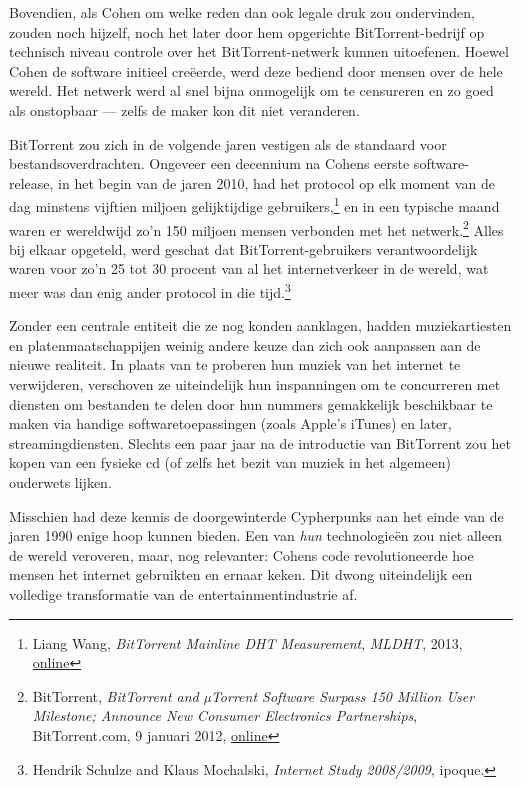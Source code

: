 \documentclass[
  a5paper,
  smalldemyvopaper,11pt,twoside,onecolumn,openright,extrafontsizes,
hidelinks]{memoir}
\begin{document}
Bovendien, als Cohen om welke reden dan ook legale druk zou ondervinden,
zouden noch hijzelf, noch het later door hem opgerichte
BitTorrent-bedrijf op technisch niveau controle over het
BitTorrent-netwerk kunnen uitoefenen. Hoewel Cohen de software initieel
creëerde, werd deze bediend door mensen over de hele wereld. Het netwerk
werd al snel bijna onmogelijk om te censureren en zo goed als onstopbaar
--- zelfs de maker kon dit niet veranderen.

BitTorrent zou zich in de volgende jaren vestigen als de standaard voor
bestandsoverdrachten. Ongeveer een decennium na Cohens eerste
software-release, in het begin van de jaren 2010, had het protocol op
elk moment van de dag minstens vijftien miljoen gelijktijdige
gebruikers,\footnote{Liang Wang, \emph{BitTorrent Mainline DHT
  Measurement}, \emph{MLDHT}, 2013,
  \href{https://www.cl.cam.ac.uk//~lw525/MLDHT/}{online}} en in een
typische maand waren er wereldwijd zo'n 150 miljoen mensen verbonden met
het netwerk.\footnote{BitTorrent, \emph{BitTorrent and µTorrent Software
  Surpass 150 Million User Milestone; Announce New Consumer Electronics
  Partnerships}, BitTorrent.com, 9 januari 2012,
  \href{https://web.archive.org/web/20140326102305/http://www.bittorrent.com/intl/es/company/about/ces_2012_150m_users}{online}}
Alles bij elkaar opgeteld, werd geschat dat BitTorrent-gebruikers
verantwoordelijk waren voor zo'n 25 tot 30 procent van al het
internetverkeer in de wereld, wat meer was dan enig ander protocol in
die tijd.\footnote{Hendrik Schulze and Klaus Mochalski, \emph{Internet
  Study 2008/2009}, ipoque.}

Zonder een centrale entiteit die ze nog konden aanklagen, hadden
muziekartiesten en platenmaatschappijen weinig andere keuze dan zich ook
aanpassen aan de nieuwe realiteit. In plaats van te proberen hun muziek
van het internet te verwijderen, verschoven ze uiteindelijk hun
inspanningen om te concurreren met diensten om bestanden te delen door
hun nummers gemakkelijk beschikbaar te maken via handige
softwaretoepassingen (zoals Apple's iTunes) en later, streamingdiensten.
Slechts een paar jaar na de introductie van BitTorrent zou het kopen van
een fysieke cd (of zelfs het bezit van muziek in het algemeen) ouderwets
lijken.

Misschien had deze kennis de doorgewinterde Cypherpunks aan het einde
van de jaren 1990 enige hoop kunnen bieden. Een van \emph{hun}
technologieën zou niet alleen de wereld veroveren, maar, nog relevanter:
Cohens code revolutioneerde hoe mensen het internet gebruikten en ernaar
keken. Dit dwong uiteindelijk een volledige transformatie van de
entertainmentindustrie af.
\end{document}
